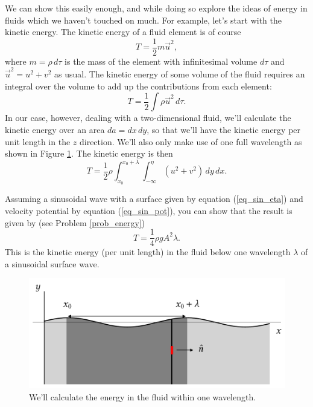 We can show this easily enough, and while doing so explore the ideas of energy in fluids which we haven't touched on much.  For example, let's start with the kinetic energy.  The kinetic energy of a fluid element is of course
\[
T = \frac{1}{2} m \vec{u}^2,
\]
where $m = \rho \, d\tau$ is the mass of the element with infinitesimal volume $d\tau$ and $\vec{u}^2 = u^2 + v^2$ as usual.  The kinetic energy of some volume of the fluid requires an integral over the volume to add up the contributions from each element:
\begin{equation}
T = \frac{1}{2} \int \rho \vec{u}^2 \, d \tau.
\end{equation}
In our case, however, dealing with a two-dimensional fluid, we'll calculate the kinetic energy over an area $da = dx \, dy$, so that we'll have the kinetic energy per unit length in the $z$ direction.  We'll also only make use of one full wavelength as shown in Figure \ref{fig_wave_energy}. The kinetic energy is then
\begin{equation}
T = \frac{1}{2} \rho \int_{x_0}^{x_0 + \lambda} \int_{-\infty}^{\eta} (u^2 + v^2) \, dy \, dx.
\end{equation} 

Assuming a sinusoidal wave with a surface given by equation (\ref{eq_sin_eta}) and velocity potential by equation (\ref{eq_sin_pot}), you can show that the result is given by (see Problem \ref{prob_energy})
\begin{equation}
T = \frac{1}{4} \rho g A^2 \lambda.
\end{equation}
This is the kinetic energy (per unit length) in the fluid below one wavelength $\lambda$ of a sinusoidal surface wave.

\begin{figure}
\centering\includegraphics[width=0.8\linewidth]{Figures/Chapter5/fig_wave_energy}
\caption{We'll calculate the energy in the fluid within one wavelength.}
\label{fig_wave_energy}
\end{figure}

